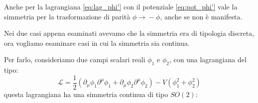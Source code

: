  Anche per la lagrangiana \eqref{eq:lag_phi'} con il potenziale \eqref{eq:pot_phi'} vale la simmetria per la trasformazione di parità $\phi\xrightarrow{}-\phi$, anche se non è manifesta.



Nei due casi appena esaminati avevamo che la simmetria era di tipologia discreta, ora vogliamo esaminare casi in cui la simmetria sia continua.




 Per farlo, consideriamo due campi scalari reali $\phi_1$ e $\phi_2$, con una lagrangiana del tipo:
\begin{equation}
  \mathcal{L}=\dfrac{1}{2}(\partial_\mu\phi_1\partial^\mu\phi_1+\partial_\mu\phi_2\partial^\mu\phi_2)-V(\phi_1^2+\phi_2^2)
\end{equation}
questa lagrangiana ha una simmetria continua di tipo $SO(2)$:

